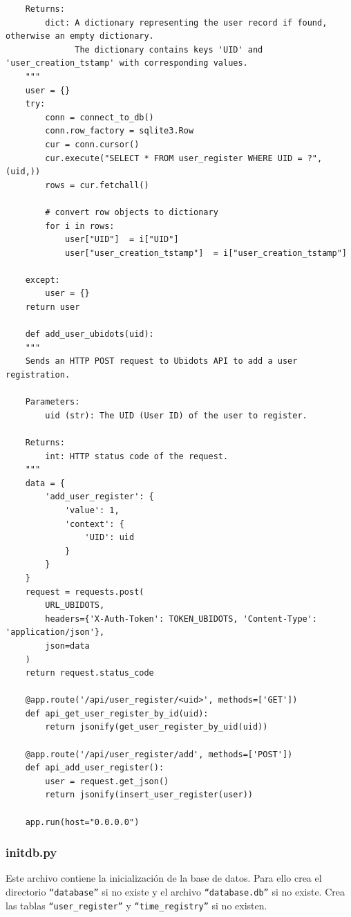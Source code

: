 \documentclass{article}
\begin{document}
\begin{lstlisting}
    Returns:
        dict: A dictionary representing the user record if found, otherwise an empty dictionary.
              The dictionary contains keys 'UID' and 'user_creation_tstamp' with corresponding values.
    """
    user = {}
    try:
        conn = connect_to_db()
        conn.row_factory = sqlite3.Row
        cur = conn.cursor()
        cur.execute("SELECT * FROM user_register WHERE UID = ?", (uid,))
        rows = cur.fetchall()

        # convert row objects to dictionary
        for i in rows:
            user["UID"]  = i["UID"]
            user["user_creation_tstamp"]  = i["user_creation_tstamp"]
            
    except:
        user = {}
    return user

	def add_user_ubidots(uid):
    """
    Sends an HTTP POST request to Ubidots API to add a user registration.

    Parameters:
        uid (str): The UID (User ID) of the user to register.

    Returns:
        int: HTTP status code of the request.
    """
    data = {
        'add_user_register': {
            'value': 1,
            'context': {
                'UID': uid
            }
        }
    }
    request = requests.post(
        URL_UBIDOTS,
        headers={'X-Auth-Token': TOKEN_UBIDOTS, 'Content-Type': 'application/json'},
        json=data
    )
    return request.status_code
	
	@app.route('/api/user_register/<uid>', methods=['GET'])
    def api_get_user_register_by_id(uid):
        return jsonify(get_user_register_by_uid(uid))
    
    @app.route('/api/user_register/add', methods=['POST'])
    def api_add_user_register():
        user = request.get_json()
        return jsonify(insert_user_register(user))

	app.run(host="0.0.0.0")
\end{lstlisting}

\subsubsection{initdb.py}
Este archivo contiene la inicialización de la base de datos.
Para ello crea el directorio \texttt{``database''} si no existe y el archivo \texttt{``database.db''} si no existe.
Crea las tablas \texttt{``user\_register''} y \texttt{``time\_registry''} si no existen.
\end{document}
